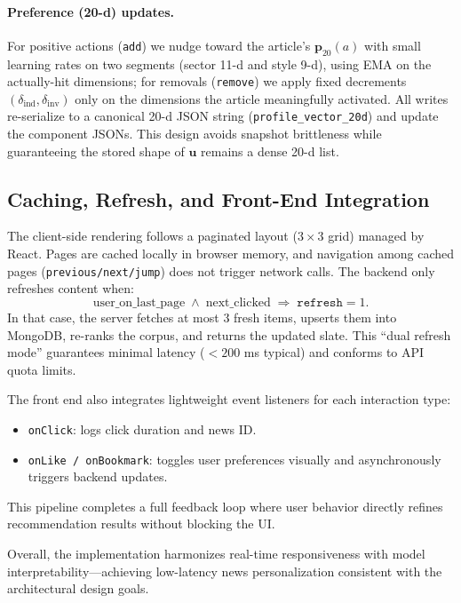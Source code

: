 \paragraph{Preference (20-d) updates.}
For positive actions (\texttt{add}) we nudge toward the article’s \(\mathbf{p}_{20}(a)\) with small learning rates on two segments (sector 11-d and style 9-d), using EMA on the actually-hit dimensions; for removals (\texttt{remove}) we apply fixed decrements \((\delta_{\text{ind}},\delta_{\text{inv}})\) only on the dimensions the article meaningfully activated. All writes re-serialize to a canonical 20-d JSON string (\texttt{profile\_vector\_20d}) and update the component JSONs. This design avoids snapshot brittleness while guaranteeing the stored shape of \(\mathbf{u}\) remains a dense 20-d list.

\subsection{Caching, Refresh, and Front-End Integration}

The client-side rendering follows a paginated layout (\(3\times3\) grid) managed by React. Pages are cached locally in browser memory, and navigation among cached pages (\texttt{previous/next/jump}) does not trigger network calls. The backend only refreshes content when:
\[
\text{user\_on\_last\_page} \;\land\; \text{next\_clicked} \;\Rightarrow\; \texttt{refresh}=1.
\]
In that case, the server fetches at most 3 fresh items, upserts them into MongoDB, re-ranks the corpus, and returns the updated slate. This “dual refresh mode” guarantees minimal latency (\(<200\) ms typical) and conforms to API quota limits.  

The front end also integrates lightweight event listeners for each interaction type:
\begin{itemize}
  \item \texttt{onClick}: logs click duration and news ID.
  \item \texttt{onLike / onBookmark}: toggles user preferences visually and asynchronously triggers backend updates.
\end{itemize}
This pipeline completes a full feedback loop where user behavior directly refines recommendation results without blocking the UI.  

Overall, the implementation harmonizes real-time responsiveness with model interpretability—achieving low-latency news personalization consistent with the architectural design goals.


